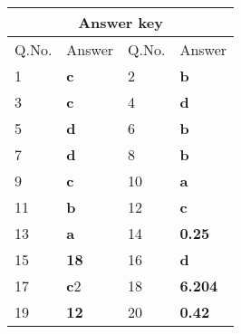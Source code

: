 \begin{table}[H]
	\centering
	\begin{tabular}{|p{1.5cm}|p{1.5cm}||p{1.5cm}|p{1.5cm}|}
		\hline
		\multicolumn{4}{|c|}{\textbf{Answer key}}\\\hline\hline
		\rowcolor{ocrel}Q.No.&Answer&Q.No.&Answer\\\hline
		1&\textbf{c} &2&\textbf{b}\\\hline
		3&\textbf{c} &4&\textbf{d} \\\hline
		5&\textbf{d} &6&\textbf{b} \\\hline
		7&\textbf{d}&8&\textbf{b}\\\hline
		9&\textbf{c}&10&\textbf{a}\\\hline
		11&\textbf{b} &12&\textbf{c}\\\hline
		13&\textbf{a}&14&\textbf{0.25}\\\hline
		15&\textbf{18}&16 &\textbf{d}\\\hline
		17&\textbf{c}2&18&\textbf{6.204}\\\hline
		19&\textbf{12}&20&\textbf{0.42}\\\hline
		
	\end{tabular}
\end{table}	